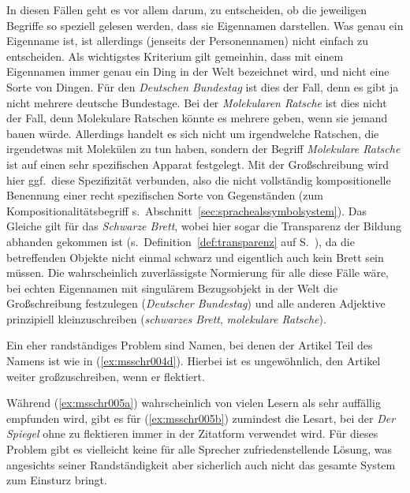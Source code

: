 In diesen Fällen geht es vor allem darum, zu entscheiden, ob die jeweiligen Begriffe so speziell gelesen werden, dass sie Eigennamen darstellen.
Was genau ein Eigenname ist, ist allerdings (jenseits der Personennamen) nicht einfach zu entscheiden.
Als wichtigstes Kriterium gilt gemeinhin, dass mit einem Eigennamen immer genau ein Ding in der Welt bezeichnet wird, und nicht eine Sorte von Dingen.
Für den \textit{Deutschen Bundestag} ist dies der Fall, denn es gibt ja nicht mehrere deutsche Bundestage.
Bei der \textit{Molekularen Ratsche} ist dies nicht der Fall, denn Molekulare Ratschen könnte es mehrere geben, wenn sie jemand bauen würde.
Allerdings handelt es sich nicht um irgendwelche Ratschen, die irgendetwas mit Molekülen zu tun haben, sondern der Begriff \textit{Molekulare Ratsche} ist auf einen sehr spezifischen Apparat festgelegt.
Mit der Großschreibung wird hier ggf.\ diese Spezifizität verbunden, also die nicht vollständig kompositionelle Benennung einer recht spezifischen Sorte von Gegenständen (zum Kompositionalitätsbegriff s.\ Abschnitt~\ref{sec:sprachealssymbolsystem}).
Das Gleiche gilt für das \textit{Schwarze Brett}, wobei hier sogar die Transparenz der Bildung abhanden gekommen ist (s.\ Definition~\ref{def:transparenz} auf S.~\pageref{def:transparenz}), da die betreffenden Objekte nicht einmal schwarz und eigentlich auch kein Brett sein müssen.
Die wahrscheinlich zuverlässigste Normierung für alle diese Fälle wäre, bei echten Eigennamen mit singulärem Bezugsobjekt in der Welt die Großschreibung festzulegen (\textit{Deutscher Bundestag}) und alle anderen Adjektive prinzipiell kleinzuschreiben (\textit{schwarzes Brett}, \textit{molekulare Ratsche}).

Ein eher randständiges Problem sind Namen, bei denen der Artikel Teil des Namens ist wie in (\ref{ex:msschr004d}).
Hierbei ist es ungewöhnlich, den Artikel weiter großzuschreiben, wenn er flektiert.

\begin{exe}
  \ex\label{ex:msschr005} 
  \begin{xlist}
  \end{xlist}
\end{exe}

Während (\ref{ex:msschr005a}) wahrscheinlich von vielen Lesern als sehr auffällig empfunden wird, gibt es für (\ref{ex:msschr005b}) zumindest die Lesart, bei der \textit{Der Spiegel} ohne zu flektieren immer in der Zitatform verwendet wird.
Für dieses Problem gibt es vielleicht keine für alle Sprecher zufriedenstellende Lösung, was angesichts seiner Randständigkeit aber sicherlich auch nicht das gesamte System zum Einsturz bringt.

